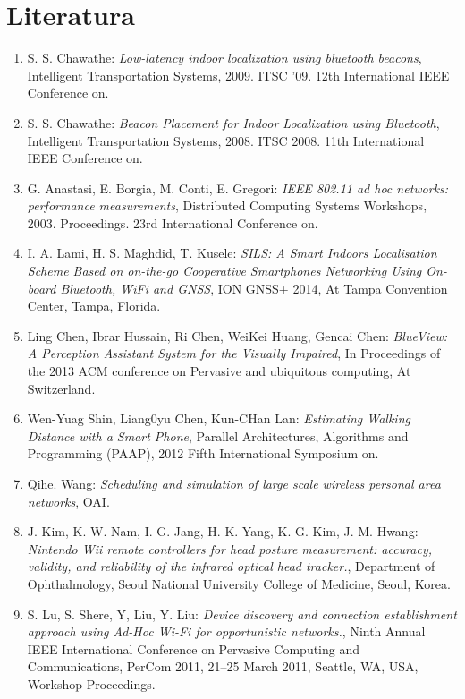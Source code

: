 \documentclass[a4paper]{article}
\begin{document}
\section{Literatura}
\begin{enumerate}[1.]
\item S. S. Chawathe: \textit{Low-latency indoor localization using bluetooth beacons}, Intelligent Transportation Systems, 2009. ITSC '09. 12th International IEEE Conference on.
\item S. S. Chawathe: \textit{Beacon Placement for Indoor Localization using Bluetooth},  Intelligent Transportation Systems, 2008. ITSC 2008. 11th International IEEE Conference on.
\item G. Anastasi, E. Borgia, M. Conti, E. Gregori: \textit{IEEE 802.11 ad hoc networks: performance measurements}, Distributed Computing Systems Workshops, 2003. Proceedings. 23rd International Conference on.
\item I. A. Lami, H. S. Maghdid, T. Kusele: \textit{SILS: A Smart Indoors Localisation Scheme Based on on-the-go Cooperative Smartphones Networking Using On-board Bluetooth, WiFi and GNSS}, ION GNSS+ 2014, At Tampa Convention Center, Tampa, Florida.
\item Ling Chen, Ibrar Hussain, Ri Chen, WeiKei Huang, Gencai Chen: \textit{BlueView: A Perception Assistant System for the Visually Impaired}, In Proceedings of the 2013 ACM conference on Pervasive and ubiquitous computing, At Switzerland.
\item Wen-Yuag Shin, Liang0yu Chen, Kun-CHan Lan: \textit{Estimating Walking Distance with a Smart Phone}, Parallel Architectures, Algorithms and Programming (PAAP), 2012 Fifth International Symposium on.
\item Qihe. Wang: \textit{Scheduling and simulation of large scale wireless personal area networks}, OAI.
\item J. Kim, K. W. Nam, I. G. Jang, H. K. Yang, K. G. Kim, J. M. Hwang: \textit{Nintendo Wii remote controllers for head posture measurement: accuracy, validity, and reliability of the infrared optical head tracker.}, Department of Ophthalmology, Seoul National University College of Medicine, Seoul, Korea.
\item S. Lu, S. Shere, Y, Liu, Y. Liu: \textit{Device discovery and connection establishment approach using Ad-Hoc Wi-Fi for opportunistic networks.}, Ninth Annual IEEE International Conference on Pervasive Computing and Communications, PerCom 2011, 21--25 March 2011, Seattle, WA, USA, Workshop Proceedings.
\end{enumerate}
\end{document}
